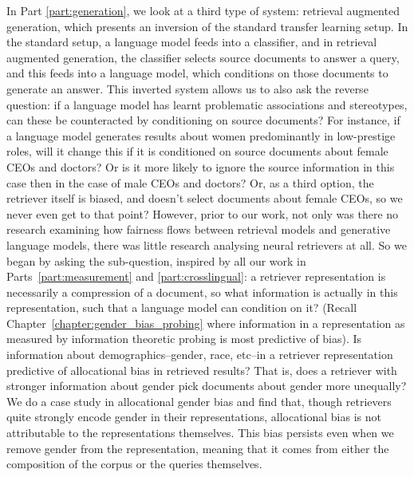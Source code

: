 In Part \ref{part:generation}, we look at a third type of system: retrieval augmented generation, which presents an inversion of the standard transfer learning setup. In the standard setup,  a language model feeds into a classifier, and in retrieval augmented generation, the classifier selects source documents to answer a query, and this feeds into a language model, which conditions on those documents to generate an answer. This inverted system allows us to also ask the reverse question: if a language model has learnt problematic associations and stereotypes, can these be counteracted by conditioning on source documents? For instance, if a language model generates results about women predominantly in low-prestige roles, will it change this if it is conditioned on source documents about female CEOs and doctors? Or is it more likely to ignore the source information in this case then in the case of male CEOs and doctors? Or, as a third option, the retriever itself is biased, and doesn't select documents about female CEOs, so we never even get to that point?
However, prior to our work, not only was there no research examining how fairness flows between retrieval models and generative language models, there was little research analysing neural retrievers at all. So we began by asking the sub-question, inspired by all our work in Parts~\ref{part:measurement} and \ref{part:crosslingual}: a retriever representation is necessarily a compression of a document, so what information is actually in this representation, such that 
 a language model can condition on it? (Recall Chapter~\ref{chapter:gender_bias_probing} where information in a representation as measured by information theoretic probing is most predictive of bias). Is information about demographics--gender, race, etc--in a retriever representation predictive of allocational bias in retrieved results? That is, does a retriever with stronger information about gender pick documents about gender more unequally? We do a case study in allocational gender bias and find that, though retrievers quite strongly encode gender in their representations, allocational bias is not attributable to the representations themselves. This bias persists even when we remove gender from the representation, meaning that it comes from either the composition of the corpus or the queries themselves. 
 

